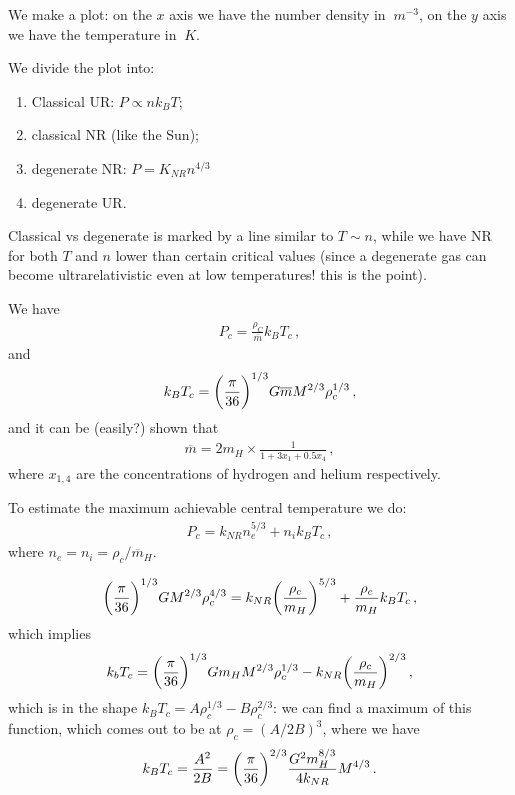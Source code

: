 \documentclass[main.tex]{subfiles}
\begin{document}
We make a plot: on the \(x\) axis we have the number density in \(\SI{}{m^{-3}}\), on the \(y\) axis we have the temperature in \(\SI{}{K}\).

We divide the plot into: 
\begin{enumerate}
    \item Classical UR: \(P \propto n k_B T\);
    \item classical NR (like the Sun);
    \item degenerate NR: \(P = K_{NR} n^{4/3}\)
    \item degenerate UR. 
\end{enumerate}

Classical vs degenerate is marked by a line similar to \(T \sim n\), while we have NR for both \(T\) and \(n\) lower than certain critical values (since a degenerate gas can become ultrarelativistic even at low temperatures! this is the point).

We have 
%
\begin{align}
  P_c = \frac{\rho _C}{\overline{m}} k_B T_c
\,,
\end{align}
%
and 
%
\begin{align}
  k_B T_c = \qty(\frac{\pi }{36})^{1/3} G \overline{m}
  M^{2/3} \rho _c^{1/3}
\,,
\end{align}
%
and it can be (easily?) shown that 
%
\begin{align}
  \overline{m} = 2 m_H \times \frac{1}{1 + 3x_1 + 0.5 x_4}
\,,
\end{align}
%
where \(x_{1, 4}\) are the concentrations of hydrogen and helium respectively. 

To estimate the maximum achievable central temperature we do: 
%
\begin{align}
  P_c = k_{NR} n_{e}^{5/3} + n_i k_B T_c
\,,
\end{align}
%
where \(n_e = n_i  = \rho_{c} / \overline{m}_{H}\). 


%
\begin{align}
  \qty(\frac{\pi}{36})^{1/3} G M^{2/3} \rho_{c}^{4/3}
  = k_{NR} \qty(\frac{\rho_c}{m_{H}})^{5/3} + \frac{\rho_{c}}{m_H} k_B T_c
\,,
\end{align}
%
which implies 
%
\begin{align}
  k_b T_c = \qty(\frac{\pi}{36})^{1/3} G m_{H} M^{2/3} \rho_{c}^{1/3} - k_{NR} \qty(\frac{\rho_{c}}{m_H})^{2/3}
\,,
\end{align}
%
which is in the shape \(k_B T_c = A \rho_{c}^{1/3} - B \rho_{c}^{2/3}  \): we can find a maximum of this function, which comes out to be at \(\rho_{c} = (A/ 2B)^{3}\), where we have 
%
\begin{align}
  k_B T_c = \frac{A^2}{2B} = \qty(\frac{\pi }{36})^{2/3} \frac{G^2m_H^{8/3}}{4 k_{NR}} M^{4/3}
\,.
\end{align}
\end{document}
